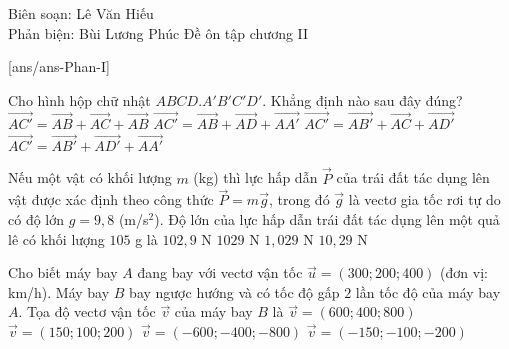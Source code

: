 ﻿\begin{name}
 {Biên soạn: Lê Văn Hiếu\\Phản biện: Bùi Lương Phúc}
{Đề ôn tập chương II}
\end{name}

\caulc
{}[ans/ans\currfilebase-Phan-I]
\begin{ex}%
 Cho hình hộp chữ nhật $ABCD.A'B'C'D'$. Khẳng định nào sau đây đúng?
 \choice
 {$\overrightarrow{AC'}=\overrightarrow{AB}+\overrightarrow{AC}+\overrightarrow{AB}$}
 {\True $\overrightarrow{AC'}=\overrightarrow{AB}+\overrightarrow{AD}+\overrightarrow{AA'}$}
 {$\overrightarrow{AC'}=\overrightarrow{AB'}+\overrightarrow{AC}+\overrightarrow{AD'}$}
 {$\overrightarrow{AC'}=\overrightarrow{AB'}+\overrightarrow{AD'}+\overrightarrow{AA'}$}
\end{ex}

\begin{ex}%
 Nếu một vật có khối lượng $m$ (kg) thì lực hấp dẫn $\overrightarrow{P}$ của trái đất tác dụng lên vật được xác định theo công thức $\overrightarrow P=m\overrightarrow g$, trong đó $\overrightarrow g$ là vectơ gia tốc rơi tự do có độ lớn $g=9{,}8$ (m/s$^2$). Độ lớn của lực hấp dẫn trái đất tác dụng lên một quả lê có khối lượng $105$ g là
 \choice
 {$102{,}9$ N}
 {$1029$ N}
 {\True $1{,}029$ N}
 {$10{,}29$ N}
\end{ex}

\begin{ex}%
 Cho biết máy bay $A$ đang bay với vectơ vận tốc $\overrightarrow u=( 300;200;400)$ (đơn vị: km/h). Máy bay $B$ bay ngược hướng và có tốc độ gấp $2$ lần tốc độ của máy bay $A$. Tọa độ vectơ vận tốc $\overrightarrow v$ của máy bay $B$ là
 \choice
 {$\overrightarrow v=(600;400;800)$}
 {$\overrightarrow v=(150;100;200)$}
 {\True $\overrightarrow v=(-600;-400;-800)$}
 {$\overrightarrow v=(-150;-100;-200)$}
 \end{ex}

